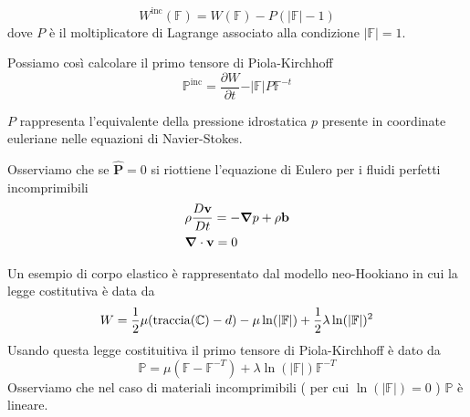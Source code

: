 \begin{equation*}
W^{\text{inc}}(\mathbb{F}) = W(\mathbb{F})-P(\vert\mathbb{F}\vert - 1)
\end{equation*}
dove $P$ è il moltiplicatore di Lagrange associato alla condizione $\vert\mathbb{F}\vert=1$.

Possiamo così calcolare il primo tensore di Piola-Kirchhoff
\begin{equation*}
\mathbb{P}^{\text{inc}}=\frac{\partial W}{\partial t}-\vert\mathbb{F}\vert P\mathbb{F}^{-t}
\end{equation*}


$P$ rappresenta l'equivalente della pressione idrostatica $p$ presente in coordinate euleriane nelle equazioni di Navier-Stokes.

Osserviamo che se $\widehat{\mathbf{P}}=0$  si riottiene l'equazione di Eulero per i fluidi perfetti incomprimibili
\begin{align*}
&\rho\frac{D \mathbf{v}}{Dt} = -\boldsymbol{\nabla} p+\rho\mathbf{b} \\
&\boldsymbol{\nabla}\cdot\mathbf{v}=0
\end{align*}

Un esempio di corpo elastico è rappresentato dal modello neo-Hookiano in cui la legge costitutiva è data da
\begin{equation*}
W = \frac{1}{2}\mu(\operatorname{traccia}(\mathbb{C})-d)-\mu\ln(\vert\mathbb{F}\vert)+\frac{1}{2}\lambda\ln(\vert\mathbb{F}\vert)^2
\end{equation*}
Usando questa legge costituitiva il primo tensore di Piola-Kirchhoff è dato da
\begin{equation*}
\mathbb{P} = \mu(\mathbb{F}-\mathbb{F}^{-T})+\lambda\ln(\vert\mathbb{F}\vert)\mathbb{F}^{-T}
\end{equation*}
Osserviamo che nel caso di materiali incomprimibili ( per cui $\ln(\vert\mathbb{F}\vert)=0$ ) $\mathbb{P}$ è lineare.
%

